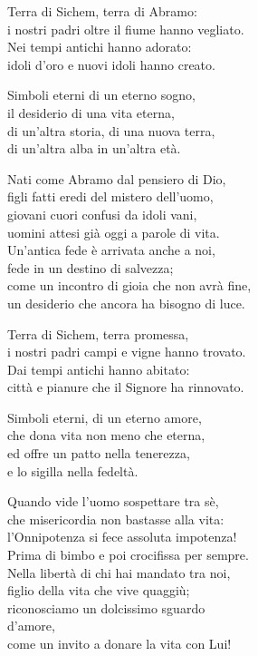 
Terra di Sichem, terra di Abramo:\\
i nostri padri oltre il fiume hanno vegliato.\\
Nei tempi antichi hanno adorato:\\
idoli d'oro e nuovi idoli hanno creato.

\spazio

Simboli eterni di un eterno sogno,\\
il desiderio di una vita eterna,\\
di un'altra storia, di una nuova terra,\\
di un'altra alba in un'altra età.

\spazio

Nati come Abramo dal pensiero di Dio,\\
figli fatti eredi del mistero dell'uomo,\\
giovani cuori confusi da idoli vani,\\
uomini attesi già oggi a parole di vita.\\
Un'antica fede è arrivata anche a noi,\\
fede in un destino di salvezza;\\
come un incontro di gioia che non avrà fine,\\
un desiderio che ancora ha bisogno di luce.

\spazio

Terra di Sichem, terra promessa,\\
i nostri padri campi e vigne hanno trovato.\\
Dai tempi antichi hanno abitato:\\
città e pianure che il Signore ha rinnovato.

\spazio

Simboli eterni, di un eterno amore,\\
che dona vita non meno che eterna,\\
ed offre un patto nella tenerezza,\\
e lo sigilla nella fedeltà.

\spazio

Quando vide l'uomo sospettare tra sè,\\
che misericordia non bastasse alla vita:\\
l'Onnipotenza si fece assoluta impotenza!\\
Prima di bimbo e poi crocifissa per sempre.\\
Nella libertà di chi hai mandato tra noi,\\
figlio della vita che vive quaggiù;\\
riconosciamo un dolcissimo sguardo\\
d'amore,\\
come un invito a donare la vita con Lui!

